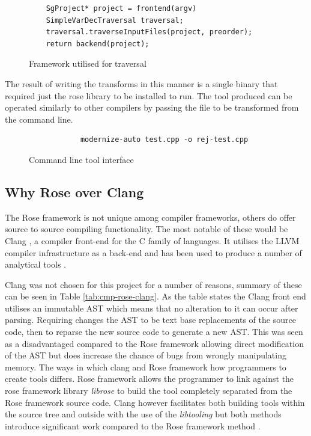 \documentclass[bsc,frontabs,singlespacing,parskip,deptreport]{infthesis}
\begin{document}
\begin{figure}[!h]
    \centering
    \begin{verbatim}
    SgProject* project = frontend(argv)
    SimpleVarDecTraversal traversal;
    traversal.traverseInputFiles(project, preorder);
    return backend(project);
    \end{verbatim}
    \caption{Framework utilised for traversal}
    \label{fig:trav-proj}
\end{figure}

The result of writing the transforms in this manner is a single binary that required just the rose library to be installed to run. The tool produced can be operated similarly to other compilers by passing the file to be transformed from the command line.

\begin{figure}[!h]
    \centering
    \begin{verbatim}
            modernize-auto test.cpp -o rej-test.cpp
    \end{verbatim}
    \caption{Command line tool interface}
    \label{fig:cmd-opt}
\end{figure}

    
\subsection{Why Rose over Clang}
The Rose framework is not unique among compiler frameworks, others do offer source to source compiling functionality. The most notable of these would be Clang \cite{CLANG}, a compiler front-end for the C family of languages. It utilises the LLVM compiler infrastructure as a back-end and has been used to produce a number of analytical tools \cite{CLANG_TOOLS}. 

Clang was not chosen for this project for a number of reasons, summary of these can be seen in Table \ref{tab:cmp-rose-clang}. As the table states the Clang front end utilises an immutable AST which means that no alteration to it can occur after parsing. Requiring changes the AST to be text base replacements of the source code, then to reparse the new source code to generate a new AST. This was seen as a disadvantaged compared to the Rose framework allowing direct modification of the AST but does increase the chance of bugs from wrongly manipulating memory. The ways in which clang and Rose framework how programmers to create tools differs. Rose framework allows the programmer to link against the rose framework library \textit{librose} to build the tool completely separated from the Rose framework source code. Clang however facilitates both building tools within the source tree and outside with the use of the \textit{libtooling} \cite{CLANG_TOOLS_LIB} but both methods introduce significant work compared to the Rose framework method \cite{ROSE_MAKE}.
\end{document}

